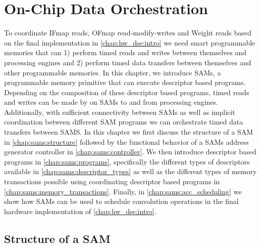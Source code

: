 \chapter{On-Chip Data Orchestration}
\label{chap:sams:intro}

To coordinate IFmap reads, OFmap read-modify-writes and Weight reads based on
the final implementation in \autoref{chap:hw_dse:intro} we need smart
programmable memories that can 1) perform timed reads and writes between
themselves and processing engines and 2) perform timed data transfers between
themselves and other programmable memories. In this chapter, we introduce \ac{SAM}s, a programmable memory
primitive that can execute descriptor based programs. Depending on the
composition of these descriptor based programs, timed reads and writes can be
made by on SAMs to and from processing engines. Additionally, with sufficient
connectivity between SAMs as well as implicit coordination between different SAM
programs we can orchestrate timed data transfers between SAMS. In this chapter
we first discuss the structure of a SAM in \autoref{chap:sams:structure}
followed by the functional behavior of a SAMs address generator controller in
\autoref{chap:sams:controller}. We then introduce descriptor based programs in
\autoref{chap:sams:programs}, specifically the different types of descriptors
available in \autoref{chap:sams:descriptor_types} as well as the different types
of memory transactions possible using coordinating descriptor based programs in
\autoref{chap:sams:memory_transactions}. Finally, in \autoref{chap:sams:acc_scheduling}
we show how SAMs can be used to schedule convolution operations in the final
hardware implementation of \autoref{chap:hw_dse:intro}.

\clearpage
\section{Structure of a SAM}
\label{chap:sams:structure}

